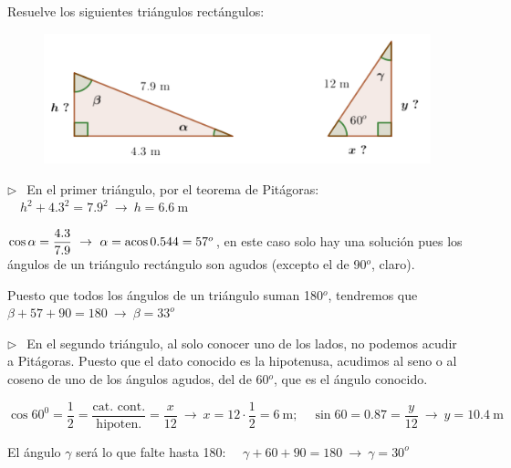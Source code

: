 \vspace{5mm}
\begin{miejemplo}

Resuelve los siguientes triángulos rectángulos:	

\begin{figure}[H]
	\centering
	\includegraphics[width=.75\textwidth]{img-rt/rt31.png}
\end{figure}

\vspace{5mm} $\triangleright \ \ $ En el primer triángulo, por el teorema de Pitágoras: $\quad h^2+4.3^2=7.9^2 \ \to \ h= 6.6\ \mathrm{m}$

\vspace{2mm} $\cos \alpha=\dfrac{4.3}{7.9}\ \to \ \alpha=\acos 0.544= 57^o$, en este caso solo hay una solución pues los ángulos de un triángulo rectángulo son agudos (excepto el de 90$^o$, claro). 

\vspace{2mm} Puesto que todos los ángulos de un triángulo suman 180$^o$, tendremos que $\beta+57+90=180 \ \to \ \beta=33^o$ 

\vspace{5mm} $\triangleright \ \ $ En el segundo triángulo, al solo conocer uno de los lados, no podemos acudir a Pitágoras. Puesto que el dato conocido es la hipotenusa, acudimos al seno o al coseno de uno de los ángulos agudos, del de 60$^o$, que es el ángulo conocido.

\vspace{2mm} $\cos 60^0=\dfrac1 2 =\dfrac {\text{cat. cont.}}{\text{hipoten.}}=\dfrac{x}{12} \ \to \ x=12\cdot \dfrac 1 2 = 6\ \mathrm{m};\quad \sin 60=0.87=\dfrac y {12} \ \to \ y=10.4\ \mathrm{m}$

\vspace{2mm} El ángulo $\gamma$ será lo que falte hasta 180: $\quad \gamma+60+90=180 \ \to \ \gamma=30^o$
\end{miejemplo}


